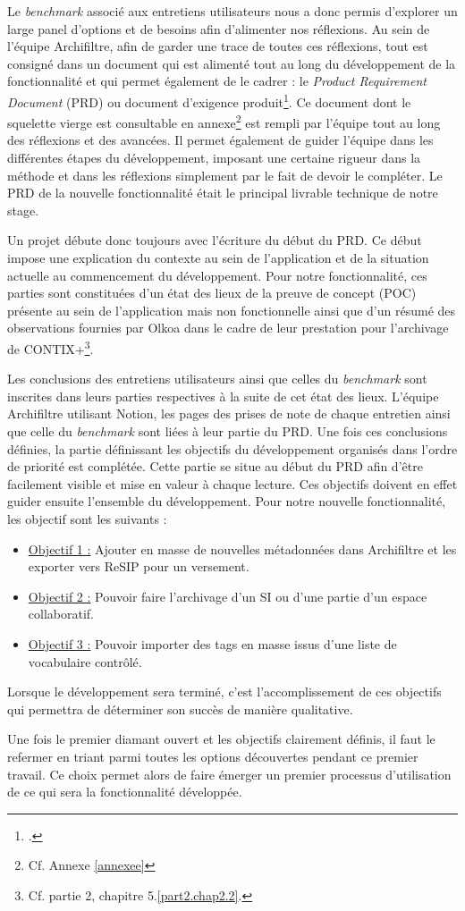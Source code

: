 Le \textit{\gls{benchmark}} associé aux entretiens utilisateurs nous a donc permis d’explorer un large panel d’options et de besoins afin d’alimenter nos réflexions. Au sein de l’équipe \gls{Archifiltre}, afin de garder une trace de toutes ces réflexions, tout est consigné dans un document qui est alimenté tout au long du développement de la fonctionnalité et qui permet également de le cadrer : le \textit{Product Requirement Document} (\gls{PRD}) ou document d’exigence produit\footcite{formlabs_comment_nodate}. Ce document dont le squelette vierge est consultable en annexe\footnote{Cf. Annexe \ref{annexee}} est rempli par l’équipe tout au long des réflexions et des avancées. Il permet également de guider l’équipe dans les différentes étapes du développement, imposant une certaine rigueur dans la méthode et dans les réflexions simplement par le fait de devoir le compléter. Le \gls{PRD} de la nouvelle fonctionnalité était le principal livrable technique de notre stage.


Un projet débute donc toujours avec l’écriture du début du \gls{PRD}. Ce début impose une explication du contexte au sein de l’application et de la situation actuelle au commencement du développement. Pour notre fonctionnalité, ces parties sont constituées d’un état des lieux de la preuve de concept (\gls{POC}) présente au sein de l’application mais non fonctionnelle ainsi que d’un résumé des observations fournies par Olkoa dans le cadre de leur prestation pour l’archivage de CONTIX+\footnote{Cf. partie 2, chapitre 5.\ref{part2.chap2.2}.}. 


Les conclusions des entretiens utilisateurs ainsi que celles du \textit{\gls{benchmark}} sont inscrites dans leurs parties respectives à la suite de cet état des lieux. L’équipe \gls{Archifiltre} utilisant Notion, les pages des prises de note de chaque entretien ainsi que celle du \textit{\gls{benchmark}} sont liées à leur partie du \gls{PRD}. Une fois ces conclusions définies, la partie définissant les objectifs du développement organisés dans l’ordre de priorité est complétée. Cette partie se situe au début du \gls{PRD} afin d’être facilement visible et mise en valeur à chaque lecture. Ces objectifs doivent en effet guider ensuite l’ensemble du développement. Pour notre nouvelle fonctionnalité, les objectif sont les suivants : 
\begin{itemize}
	\item \underline{Objectif 1 :} Ajouter en masse de nouvelles métadonnées dans \gls{Archifiltre} et les exporter vers ReSIP pour un versement.
	\item \underline{Objectif 2 :} Pouvoir faire l’archivage d’un \gls{SI} ou d’une partie d’un espace collaboratif.
	\item \underline{Objectif 3 :} Pouvoir importer des tags en masse issus d’une liste de vocabulaire contrôlé.
\end{itemize}
Lorsque le développement sera terminé, c’est l’accomplissement de ces objectifs qui permettra de déterminer son succès de manière qualitative.


Une fois le premier diamant ouvert et les objectifs clairement définis, il faut le refermer en triant parmi toutes les options découvertes pendant ce premier travail. Ce choix permet alors de faire émerger un premier processus d’utilisation de ce qui sera la fonctionnalité développée.